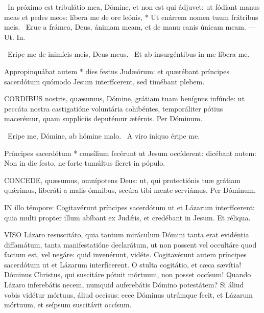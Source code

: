 \R\ In próximo est tribulátio mea, Dómine, et non est qui ádjuvet; ut fódiant manus meas et pedes meos: líbera me de ore leónis, * Ut enárrem nomen tuum frátribus meis. \V\ Erue a frámea, Deus, ánimam meam, et de manu canis únicam meam. --- Ut. In.

\V\ Eripe me de inimícis meis, Deus meus. \R\ Et ab insurgéntibus in me líbera me.

 Appropinquábat autem * dies festus Judæórum: et quærébant príncipes sacerdótum quómodo Jesum interfícerent, sed timébant plebem.


\lettrine[lines=2]{C}{ORDIBUS} nostris, quæsumus, Dómine, grátiam tuam benígnus infúnde: ut peccáta nostra castigatióne voluntária cohibéntes, temporáliter pótius macerémur, quam supplíciis deputémur ætérnis. Per Dóminum.

\V\ Eripe me, Dómine, ab hómine malo. \R\ A viro iníquo éripe me.

 Príncipes sacerdótum * consílium fecérunt ut Jesum occíderent: dicébant autem: Non in die festo, ne forte tumúltus fíeret in pópulo.


\lettrine[lines=2]{C}{ONCEDE}, quæsumus, omnípotens Deus: ut, qui protectiónis tuæ grátiam quǽrimus, liberáti a malis ómnibus, secúra tibi mente serviámus. Per Dóminum.

\sectionornament




\lettrine[lines=2]{I}{N} illo témpore: Cogitavérunt príncipes sacerdótum ut et Lázarum interfícerent: quia multi propter illum abíbant ex Judǽis, et credébant in Jesum. Et réliqua.



\lettrine[lines=2]{V}{ISO} Lázaro resuscitáto, quia tantum miráculum Dómini tanta erat evidéntia diffamátum, tanta manifestatióne declarátum, ut non possent vel occultáre quod factum est, vel negáre: quid invenérunt, vidéte. Cogitavérunt autem príncipes sacerdótum ut et Lázarum interfícerent. O stulta cogitátio, et cæca sævítia! Dóminus Christus, qui suscitáre pótuit mórtuum, non posset occísum! Quando Lázaro inferebátis necem, numquid auferebátis Dómino potestátem? Si áliud vobis vidétur mórtuus, áliud occísus: ecce Dóminus utrúmque fecit, et Lázarum mórtuum, et seípsum suscitávit occísum.

